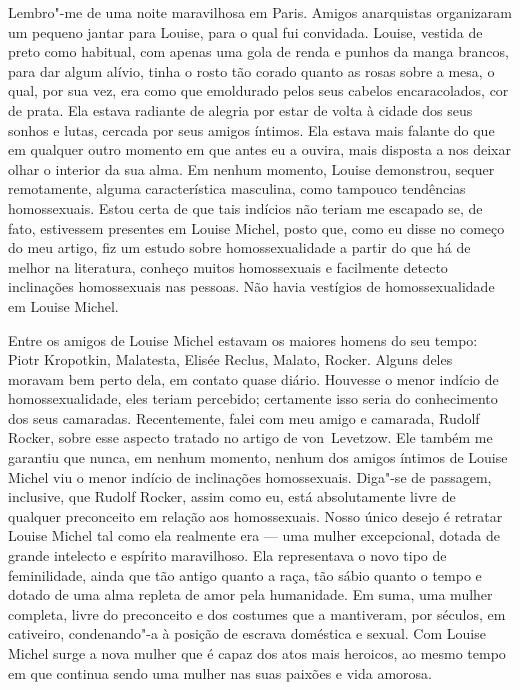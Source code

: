 Lembro"-me de uma noite maravilhosa em Paris. Amigos anarquistas
organizaram um pequeno jantar para Louise, para o qual fui convidada.
Louise, vestida de preto como habitual, com apenas uma gola de renda e
punhos da manga brancos, para dar algum alívio, tinha o rosto tão corado
quanto as rosas sobre a mesa, o qual, por sua vez, era como que
emoldurado pelos seus cabelos encaracolados, cor de prata. Ela estava
radiante de alegria por estar de volta à cidade dos seus sonhos e lutas,
cercada por seus amigos íntimos. Ela estava mais falante do que em
qualquer outro momento em que antes eu a ouvira, mais disposta a nos
deixar olhar o interior da sua alma. Em nenhum momento, Louise
demonstrou, sequer remotamente, alguma característica masculina, como
tampouco tendências homossexuais. Estou certa de que tais indícios não
teriam me escapado se, de fato, estivessem presentes em Louise Michel,
posto que, como eu disse no começo do meu artigo, fiz um estudo sobre
homossexualidade a partir do que há de melhor na literatura, conheço muitos
homossexuais e facilmente detecto inclinações homossexuais nas pessoas.
Não havia vestígios de homossexualidade em Louise Michel.

Entre os amigos de Louise Michel estavam os maiores homens do seu tempo:
Piotr Kropotkin, Malatesta, Elisée Reclus, Malato, Rocker. Alguns deles
moravam bem perto dela, em contato quase diário. Houvesse o menor
indício de homossexualidade, eles teriam percebido; certamente isso
seria do conhecimento dos seus camaradas. Recentemente, falei com meu
amigo e camarada, Rudolf Rocker, sobre esse aspecto tratado no artigo de
von~Levetzow. Ele também me garantiu que nunca, em nenhum momento,
nenhum dos amigos íntimos de Louise Michel viu o menor indício de
inclinações homossexuais. Diga"-se de passagem, inclusive, que Rudolf
Rocker, assim como eu, está absolutamente livre de qualquer preconceito
em relação aos homossexuais. Nosso único desejo é retratar Louise Michel
tal como ela realmente era --- uma mulher excepcional, dotada de grande
intelecto e espírito maravilhoso. Ela representava o novo tipo de
feminilidade, ainda que tão antigo quanto a raça, tão sábio quanto o
tempo e dotado de uma alma repleta de amor pela humanidade. Em suma, uma
mulher completa, livre do preconceito e dos costumes que a mantiveram, por séculos, em cativeiro, condenando"-a à posição de escrava
doméstica e sexual. Com Louise Michel surge a nova mulher que é capaz
dos atos mais heroicos, ao mesmo tempo em que continua sendo uma mulher
nas suas paixões e vida amorosa.

